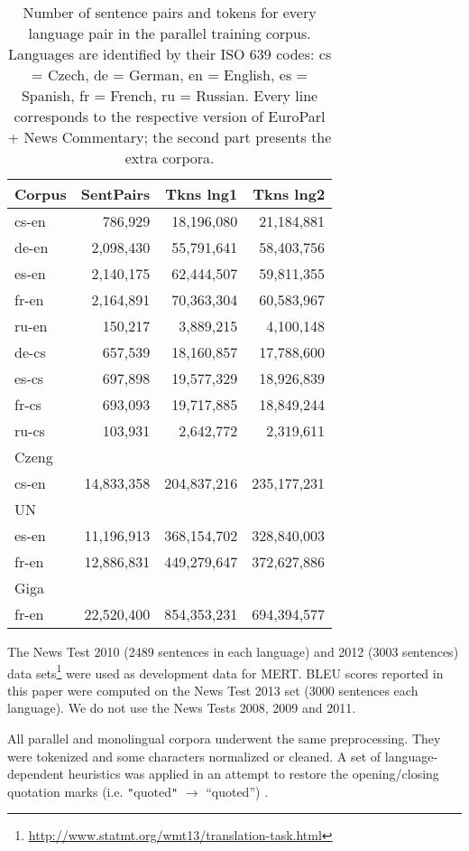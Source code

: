 \documentclass[11pt,letterpaper]{article}
\def\footurl#1{{\footnote{\url{#1}}}}
\def\code#1{{\tt{}#1}}
\begin{document}
\begin{table}[htbl]
\begin{center}
{\small
\begin{tabular}{l | r r r}
Corpus & SentPairs & Tkns lng1 & Tkns lng2\\
\hline
cs-en & 786,929 & 18,196,080 & 21,184,881\\
de-en & 2,098,430 & 55,791,641 & 58,403,756\\
es-en & 2,140,175 & 62,444,507 & 59,811,355\\
fr-en & 2,164,891 & 70,363,304 & 60,583,967\\
ru-en & 150,217 & 3,889,215 & 4,100,148\\
de-cs & 657,539 & 18,160,857 & 17,788,600\\
es-cs & 697,898 & 19,577,329 & 18,926,839\\
fr-cs & 693,093 & 19,717,885 & 18,849,244\\
ru-cs & 103,931 & 2,642,772 & 2,319,611\\
\hline
Czeng & & &\\
cs-en & 14,833,358 & 204,837,216 & 235,177,231\\
\hline
UN & & &\\
es-en & 11,196,913 & 368,154,702 & 328,840,003\\
fr-en & 12,886,831 & 449,279,647 & 372,627,886\\
\hline
Giga & & &\\
fr-en & 22,520,400 & 854,353,231 & 694,394,577\\
\end{tabular}
}
\end{center}
\caption{Number of sentence pairs and tokens for every language pair in the parallel training corpus. Languages are identified by their ISO 639 codes: cs = Czech, de = German, en = English, es = Spanish, fr = French, ru = Russian.
Every line corresponds
to the respective version of EuroParl + News Commentary;
the second part presents the extra corpora.}
\label{tab:newscommentary}
\end{table}

The News Test 2010
(2489 sentences in each language) and 2012 (3003 sentences)
data sets\footurl{http://www.statmt.org/wmt13/translation-task.html} were used
as development data for MERT.
BLEU scores reported in this paper were computed on the News Test 2013 set
(3000 sentences each language).
We do not use the News Tests 2008, 2009 and 2011.

All parallel and monolingual corpora underwent the same preprocessing.
They were tokenized and some characters normalized or cleaned.
A set of language-dependent heuristics was applied in an attempt to restore
the opening/closing quotation marks (i.e. \code{"}quoted\code{"} $\rightarrow$ ``quoted'')
\cite{zemanwmt12}.
\begin{comment}
The motivation is twofold here:
First, we hope that paired quotation marks could occasionally work as brackets and better denote parallel phrases for Moses;
second, if Moses learns to output directed quotation marks, subsequent detokenization will be easier.
\end{comment}
\end{document}
